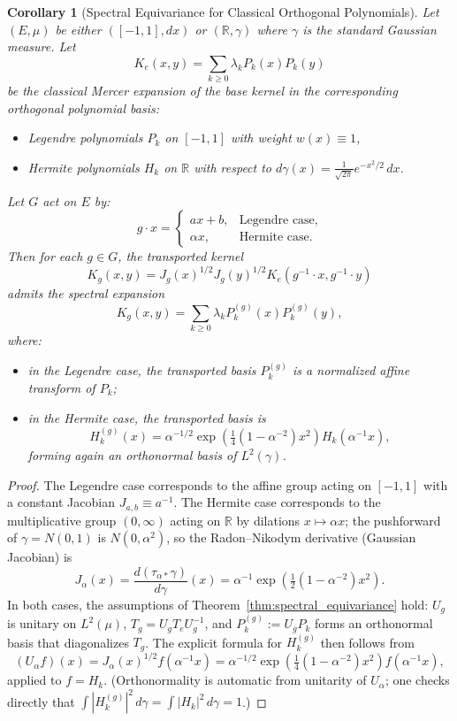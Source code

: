 \documentclass[11pt,a4paper]{article}
\newtheorem{corollary}[theorem]{Corollary}
\newcommand{\R}{\mathbb{R}}
\begin{document}
\begin{corollary}[Spectral Equivariance for Classical Orthogonal Polynomials]\label{cor:classical}
Let $(E, \mu)$ be either $([-1,1], dx)$ or $(\R, \gamma)$ where $\gamma$ is the standard Gaussian measure. Let
\[
K_e(x, y) = \sum_{k \geq 0} \lambda_k P_k(x) P_k(y)
\]
be the classical Mercer expansion of the base kernel in the corresponding orthogonal polynomial basis:
\begin{itemize}
\item Legendre polynomials $P_k$ on $[-1, 1]$ with weight $w(x) \equiv 1$,
\item Hermite polynomials $H_k$ on $\R$ with respect to $d\gamma(x) = \frac{1}{\sqrt{2\pi}} e^{-x^2/2} \, dx$.
\end{itemize}
Let $G$ act on $E$ by:
\[
g \cdot x = \begin{cases}
ax + b, & \text{Legendre case}, \\
\alpha x, & \text{Hermite case}.
\end{cases}
\]
Then for each $g \in G$, the transported kernel
\[
K_g(x, y) = J_g(x)^{1/2} J_g(y)^{1/2} K_e(g^{-1} \cdot x, g^{-1} \cdot y)
\]
admits the spectral expansion
\[
K_g(x, y) = \sum_{k \geq 0} \lambda_k P_k^{(g)}(x) P_k^{(g)}(y),
\]
where:
\begin{itemize}
\item in the Legendre case, the transported basis $P_k^{(g)}$ is a normalized affine transform of $P_k$;
\item in the Hermite case, the transported basis is
\[
H_k^{(g)}(x) = \alpha^{-1/2} \exp\!\left(\tfrac{1}{4}(1 - \alpha^{-2}) x^2\right) H_k(\alpha^{-1} x),
\]
forming again an orthonormal basis of $L^2(\gamma)$.
\end{itemize}
\end{corollary}

\begin{proof}
The Legendre case corresponds to the affine group acting on $[-1, 1]$ with a constant Jacobian $J_{a,b}\equiv a^{-1}$. The Hermite case corresponds to the multiplicative group $(0, \infty)$ acting on $\R$ by dilations $x \mapsto \alpha x$; the pushforward of $\gamma=N(0,1)$ is $N(0,\alpha^2)$, so the Radon--Nikodym derivative (Gaussian Jacobian) is
\[
J_\alpha(x) = \frac{d(\tau_{\alpha*}\gamma)}{d\gamma}(x) = \alpha^{-1}\exp\!\left(\tfrac{1}{2}(1 - \alpha^{-2}) x^2\right).
\]
In both cases, the assumptions of Theorem~\ref{thm:spectral_equivariance} hold: $U_g$ is unitary on $L^2(\mu)$, $T_g = U_g T_e U_g^{-1}$, and $P_k^{(g)} := U_g P_k$ forms an orthonormal basis that diagonalizes $T_g$. The explicit formula for $H_k^{(g)}$ then follows from
\[
(U_\alpha f)(x) = J_\alpha(x)^{1/2} f(\alpha^{-1}x) = \alpha^{-1/2}\exp\!\left(\tfrac{1}{4}(1 - \alpha^{-2}) x^2\right) f(\alpha^{-1} x),
\]
applied to $f=H_k$. (Orthonormality is automatic from unitarity of $U_\alpha$; one checks directly that $\int |H_k^{(g)}|^2\,d\gamma = \int |H_k|^2\,d\gamma = 1$.)
\end{proof}
\end{document}
